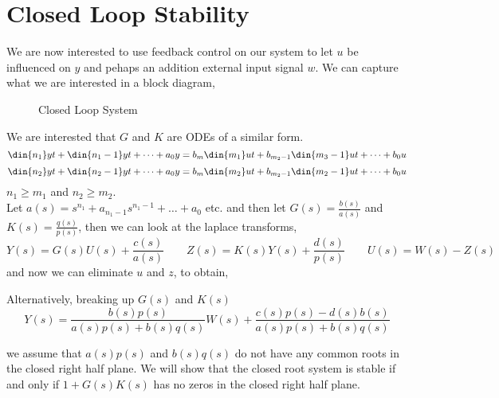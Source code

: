 \section{Closed Loop Stability}
We are now interested to use feedback control on our system to let $u$ be influenced on $y$ and pehaps an addition external input signal $w$. We can capture what we are interested in a block diagram,

\begin{figure}[!ht]
\centering
{}
\caption{Closed Loop System}
\end{figure}

\noindent
We are interested that $G$ and $K$ are ODEs of a similar form.
$$ \din {n_1} y t + \din {n_1-1} y t + \dots + a_0y = b_m\din {m_1} u t + b_{m_2-1}\din {m_3-1} u t + \dots + b_0u$$
$$ \din {n_2} y t + \din {n_2-1} y t + \dots + a_0y = b_m\din {m_2} u t + b_{m_2-1}\din {m_2-1} u t + \dots + b_0u$$
$n_1 \ge m_1$ and $n_2 \ge m_2$.\\
Let $a(s) = s^{n_1} + a_{n_1 - 1}s^{n_1 - 1} + \dots + a_0$ etc. and then let $G(s) = \frac{b(s)}{a(s)}$ and $K(s) = \frac{q(s)}{p(s)}$, then we can look at the laplace transforms,
$$ Y(s) = G(s)U(s) + \frac{c(s)}{a(s)} \qquad Z(s) = K(s)Y(s) + \frac{d(s)}{p(s)} \qquad U(s) = W(s) - Z(s) $$
and now we can eliminate $u$ and $z$, to obtain,

Alternatively, breaking up $G(s)$ and $K(s)$
$$ Y(s) = \frac{b(s) p(s)}{a(s) p(s) + b(s) q(s)} W(s) + \frac{c(s)p(s) - d(s)b(s)}{a(s)p(s) + b(s)q(s)} $$

we assume that $a(s)p(s)$ and $b(s)q(s)$ do not have any common roots in the closed right half plane. We will show that the closed root system is stable if and only if $1 + G(s)K(s)$ has no zeros in the closed right half plane. \\

